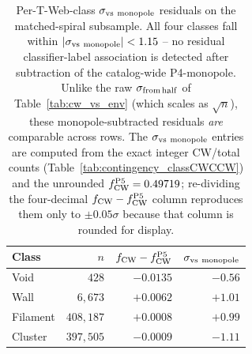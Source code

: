 \documentclass[aps,prd,twocolumn,superscriptaddress,showpacs,preprintnumbers,nofootinbib,longbibliography,floatfix]{revtex4-2}
\begin{document}
\begin{table}[ht]
\caption{Per-T-Web-class $\sigma_{\rm vs\ monopole}$ residuals on the
matched-spiral subsample. All four classes fall within
$|\sigma_{\rm vs\ monopole}| < 1.15$ -- no residual classifier-label
association is detected after subtraction of the catalog-wide P4-monopole. Unlike the raw
$\sigma_{\rm from\,half}$ of Table~\ref{tab:cw_vs_env} (which scales
as $\sqrt{n}$), these monopole-subtracted residuals \emph{are}
comparable across rows. The $\sigma_{\rm vs\ monopole}$ entries are
computed from the exact integer CW/total counts
(Table~\ref{tab:contingency_classCWCCW}) and the unrounded
$f_{\rm CW}^{\rm P5} = 0.49719$; re-dividing the four-decimal
$f_{\rm CW} - f_{\rm CW}^{\rm P5}$ column reproduces them only to
$\pm 0.05\sigma$ because that column is rounded for display.}
\label{tab:p4_monopole_residual}
\begin{ruledtabular}
\begin{tabular}{lrrr}
Class & $n$ & $f_{\rm CW} - f_{\rm CW}^{\rm P5}$ &
$\sigma_{\rm vs\ monopole}$ \\
\hline
Void     & $428$     & $-0.0135$ & $-0.56$ \\
Wall     & $6{,}673$ & $+0.0062$ & $+1.01$ \\
Filament & $408{,}187$ & $+0.0008$ & $+0.99$ \\
Cluster  & $397{,}505$ & $-0.0009$ & $-1.11$ \\
\end{tabular}
\end{ruledtabular}
\end{table}
\end{document}
